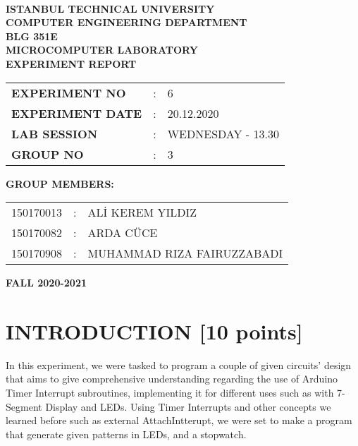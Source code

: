 \documentclass[pdftex,12pt,a4paper]{article}
\begin{document}
\begin{titlepage}
\begin{center}
\textbf{}\\
\textbf{\Large{ISTANBUL TECHNICAL UNIVERSITY}}\\
\vspace{0.5cm}
\textbf{\Large{COMPUTER ENGINEERING DEPARTMENT}}\\
\vspace{2cm}
\textbf{\Large{BLG 351E\\ MICROCOMPUTER LABORATORY\\ EXPERIMENT REPORT}}\\
\vspace{2.8cm}
\begin{table}[ht]
\centering
\Large{
\begin{tabular}{lcl}
\textbf{EXPERIMENT NO}  & : & 6 \\
\textbf{EXPERIMENT DATE}  & : & 20.12.2020 \\
\textbf{LAB SESSION}  & : & WEDNESDAY - 13.30 \\
\textbf{GROUP NO}  & : & 3 \\
\end{tabular}}
\end{table}
\vspace{1cm}
\textbf{\Large{GROUP MEMBERS:}}\\
\begin{table}[ht]
\centering
\Large{
\begin{tabular}{rcl}
150170013  & : & ALİ KEREM YILDIZ \\
150170082  & : & ARDA CÜCE \\
150170908  & : & MUHAMMAD RIZA FAIRUZZABADI \\
\end{tabular}}
\end{table}
\vspace{2.8cm}
\textbf{\Large{FALL 2020-2021}}

\end{center}

\end{titlepage}

\thispagestyle{empty}
\setcounter{tocdepth}{4}
\tableofcontents
\clearpage

\setcounter{page}{1}

\section{INTRODUCTION [10 points]}
In this experiment, we were tasked to program a couple of given circuits' design that aims to give comprehensive understanding regarding the use of Arduino Timer Interrupt subroutines, implementing it for different uses such as with 7-Segment Display and LEDs. Using Timer Interrupts and other concepts we learned before such as external AttachIntterupt, we were set to make a program that generate given patterns in LEDs, and a stopwatch.  
\end{document}
